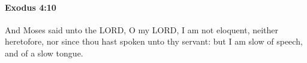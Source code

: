
		\paragraph{Exodus 4:10} %
			\label{EXODUS-4-10}

			And Moses said unto the LORD, O my LORD, I am not eloquent, neither heretofore, nor since thou hast spoken unto thy servant: but I am slow of speech, and of a slow tongue.


